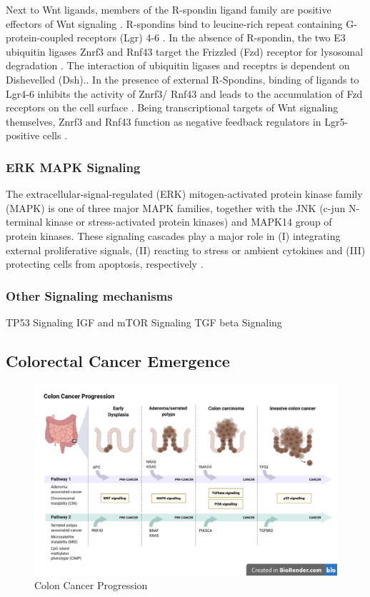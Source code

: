 \begin{flushleft}
Next to Wnt ligands, members of the R-spondin ligand family are positive effectors of Wnt signaling \cite{Kazanskaya2004, Glinka2011, Hao2012}. R-spondins bind to leucine-rich repeat containing G-protein-coupled receptors (Lgr) 4-6 \cite{Koo2012a}. In the absence of R-spondin, the two E3 ubiquitin ligases Znrf3 and Rnf43 target the Frizzled (Fzd) receptor for lysosomal degradation \cite{DeLau2011}. The interaction of ubiquitin ligases and receptrs is dependent on Dishevelled (Dsh).\cite{Jiang2015}. In the presence of external R-Spondins, binding of ligands to Lgr4-6 inhibits the activity of Znrf3/ Rnf43 and leads to the accumulation of Fzd receptors on the cell surface \cite{Hao2012, Koo2012a}. Being transcriptional targets of Wnt signaling themselves, Znrf3 and Rnf43 function as negative feedback regulators in Lgr5- positive cells \cite{DeLau2012}. \par 


\subsubsection{ERK MAPK Signaling}
The extracellular-signal-regulated (ERK) mitogen-activated protein kinase family (MAPK) is one of three major MAPK families, together with the JNK (c-jun N-terminal kinase or stress-activated protein kinases) and MAPK14 group of protein kinases. These signaling cascades play a major role in (I) integrating external proliferative signals, (II) reacting to stress or ambient cytokines and (III) protecting cells from apoptosis, respectively \cite{Oncol2005}. 


\subsubsection{Other Signaling mechanisms}


TP53 Signaling
IGF and mTOR Signaling
TGF beta Signaling

\subsection{Colorectal Cancer Emergence}


\begin{figure}[h]
\centering
\includegraphics[scale=.35]{figures/colon_cancer_progression.png}
\caption{Colon Cancer Progression}
\label{colon_cancer_progression}
\end{figure}



\end{flushleft}
